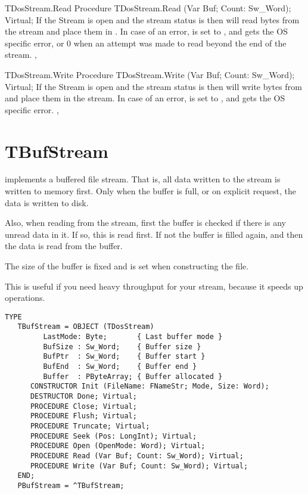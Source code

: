 \begin{procedure}{TDosStream.Read}
\Declaration
Procedure TDosStream.Read (Var Buf; Count: Sw\_Word); Virtual;
\Description
If the Stream is open and the stream status is  then 
 will read  bytes from the stream and place them
in  .
\Errors
In case of an error,  is set to , and
 gets the OS specific error, or 0 when an attempt was
made to read beyond the end of the stream.
\SeeAlso
{}, 
\end{procedure}

\begin{procedure}{TDosStream.Write}
\Declaration
Procedure TDosStream.Write (Var Buf; Count: Sw\_Word); Virtual;
\Description
If the Stream is open and the stream status is  then 
 will write  bytes from  and place them
in the stream.
\Errors
In case of an error,  is set to , and
 gets the OS specific error.
\SeeAlso
{}, 

\end{procedure}

\section{TBufStream}
\label{se:TBufStream}

 implements a buffered file stream. That is, all data written
to the stream is written to memory first. Only when the buffer is full, or
on explicit request, the data is written to disk.

Also, when reading from the stream, first the buffer is checked if there is
any unread data in it. If so, this is read first. If not the buffer is
filled again, and then the data is read from the buffer.

The size of the buffer is fixed and is set when constructing the file.

This is useful if you need heavy throughput for your stream, because it
speeds up operations.

\begin{verbatim}
TYPE
   TBufStream = OBJECT (TDosStream)
         LastMode: Byte;       { Last buffer mode }
         BufSize : Sw_Word;    { Buffer size }
         BufPtr  : Sw_Word;    { Buffer start }
         BufEnd  : Sw_Word;    { Buffer end }
         Buffer  : PByteArray; { Buffer allocated }
      CONSTRUCTOR Init (FileName: FNameStr; Mode, Size: Word);
      DESTRUCTOR Done; Virtual;
      PROCEDURE Close; Virtual;
      PROCEDURE Flush; Virtual;
      PROCEDURE Truncate; Virtual;
      PROCEDURE Seek (Pos: LongInt); Virtual;
      PROCEDURE Open (OpenMode: Word); Virtual;
      PROCEDURE Read (Var Buf; Count: Sw_Word); Virtual;
      PROCEDURE Write (Var Buf; Count: Sw_Word); Virtual;
   END;
   PBufStream = ^TBufStream;
\end{verbatim}

